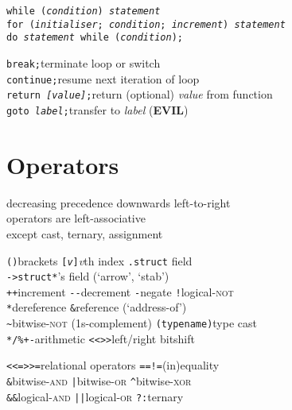 \documentclass[8pt]{article}
\newcommand{\Cc}[1]{\texttt{#1}}
\newcommand{\kw}[1]{\textcolor{black!40!lime}{\texttt{#1}}} %
\newcommand{\ty}[1]{\textcolor{blue!80}{\texttt{#1}}} %
\newcommand{\opt}[1]{\textrm{\textit{#1}}} %
\begin{document}
\begin{multicols}{3}
\Cc{\kw{while} (\opt{condition}) \opt{statement}} \\
\Cc{\kw{for} (\opt{initialiser}; \opt{condition}; \opt{increment}) \opt{statement}} \\
\Cc{\kw{do} \opt{statement} \kw{while} (\opt{condition}); }

\kw{break;}\quad terminate loop or switch \\
\kw{continue;}\quad resume next iteration of loop \\
\Cc{\kw{return} \opt{[value]};}\quad return (optional) \opt{value} from function \\
\Cc{\kw{goto} \opt{label};}\quad transfer to \opt{label} (\textbf{EVIL})

\section*{Operators}

\begin{center}
decreasing precedence downwards left-to-right\\
operators are left-associative\\
except cast, ternary, assignment
\end{center} 

\Cc{()}\quad brackets \hfill
\Cc{[\opt{v}]}\quad \opt{v}th index \hfill
\Cc{.}\quad \ty{struct} field \\
\Cc{->}\quad \ty{struct*}'s field (`arrow', `stab') \\
\Cc{++}\quad increment  \hfill
\Cc{-{}-}\quad decrement \hfill
\Cc{-}\quad negate \hfill
\Cc{!}\quad logical-\textsc{not} \\

\Cc{*}\quad dereference \hfill
\Cc{\&}\quad reference (`address-of') \\
\Cc{\~}\quad bitwise-\textsc{not} (1s-complement) \hfill
\Cc{(\ty{typename})}\quad type cast \\
\Cc{*}\quad\Cc{/}\quad\Cc{\%}\quad\Cc{+}\quad\Cc{-}\quad arithmetic \hfill
\Cc{<<}\quad\Cc{>>}\quad left/right bitshift

\Cc{<}\quad\Cc{<=}\quad\Cc{>}\quad\Cc{>=}\quad relational operators \hfill
\Cc{==}\quad\Cc{!=}\quad (in)equality \\
\Cc{\&}\quad bitwise-\textsc{and} \hfill
\Cc{|}\quad bitwise-\textsc{or} \hfill
\Cc{\^}\quad bitwise-\textsc{xor} \\
\Cc{\&\&}\quad logical-\textsc{and} \hfill
\Cc{||}\quad logical-\textsc{or} \hfill 
\Cc{?:}\quad ternary


\end{multicols}
\end{document}

